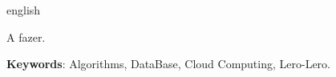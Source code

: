 \setlength{\absparsep}{18pt} %
\begin{resumo}[Abstract]
 \begin{otherlanguage*}{english}
   
A fazer.
 
   \textbf{Keywords}: Algorithms, DataBase, Cloud Computing, Lero-Lero.
 \end{otherlanguage*}
\end{resumo}